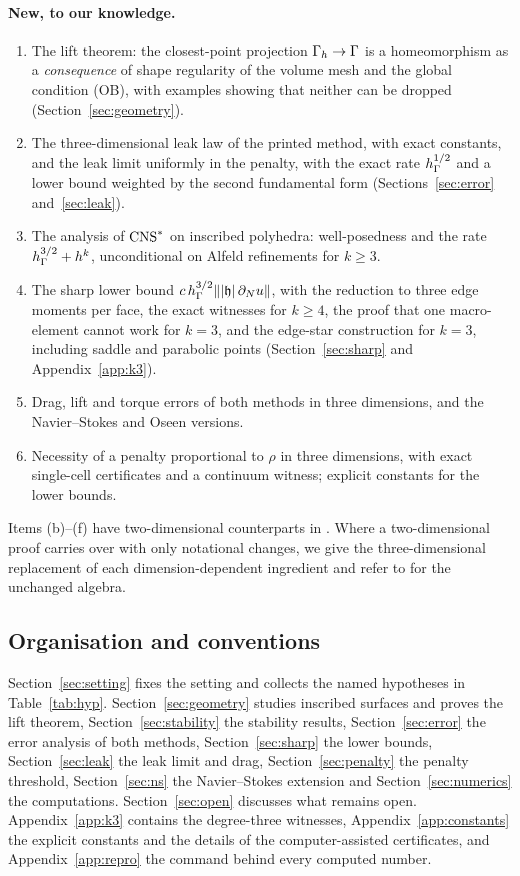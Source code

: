 \paragraph{New, to our knowledge.}
\begin{enumerate}[label=(\alph*)]
\item The lift theorem: the closest-point projection $\Gamma_h\to\Gamma$ is a homeomorphism as a \emph{consequence} of shape regularity of the volume mesh and the global condition (OB), with examples showing that neither can be dropped (Section~\ref{sec:geometry}).
\item The three-dimensional leak law of the printed method, with exact constants, and the leak limit uniformly in the penalty, with the exact rate $h_\Gamma^{1/2}$ and a lower bound weighted by the second fundamental form (Sections~\ref{sec:error} and~\ref{sec:leak}).
\item The analysis of $\mathrm{CNS}^\ast$ on inscribed polyhedra: well-posedness and the rate $h_\Gamma^{3/2}+h^k$, unconditional on Alfeld refinements for $k\ge3$.
\item The sharp lower bound $c\,h_\Gamma^{3/2}\lVert |\mathfrak h|\,\partial_Nu\rVert$, with the reduction to three edge moments per face, the exact witnesses for $k\ge4$, the proof that one macro-element cannot work for $k=3$, and the edge-star construction for $k=3$, including saddle and parabolic points (Section~\ref{sec:sharp} and Appendix~\ref{app:k3}).
\item Drag, lift and torque errors of both methods in three dimensions, and the Navier--Stokes and Oseen versions.
\item Necessity of a penalty proportional to $\rho$ in three dimensions, with exact single-cell certificates and a continuum witness; explicit constants for the lower bounds.
\end{enumerate}
Items (b)--(f) have two-dimensional counterparts in \cite{PadhiLong2D}. Where a two-dimensional proof carries over with only notational changes, we give the three-dimensional replacement of each dimension-dependent ingredient and refer to \cite{PadhiLong2D} for the unchanged algebra.

\subsection{Organisation and conventions}
Section~\ref{sec:setting} fixes the setting and collects the named hypotheses in Table~\ref{tab:hyp}. Section~\ref{sec:geometry} studies inscribed surfaces and proves the lift theorem, Section~\ref{sec:stability} the stability results, Section~\ref{sec:error} the error analysis of both methods, Section~\ref{sec:sharp} the lower bounds, Section~\ref{sec:leak} the leak limit and drag, Section~\ref{sec:penalty} the penalty threshold, Section~\ref{sec:ns} the Navier--Stokes extension and Section~\ref{sec:numerics} the computations. Section~\ref{sec:open} discusses what remains open. Appendix~\ref{app:k3} contains the degree-three witnesses, Appendix~\ref{app:constants} the explicit constants and the details of the computer-assisted certificates, and Appendix~\ref{app:repro} the command behind every computed number.

